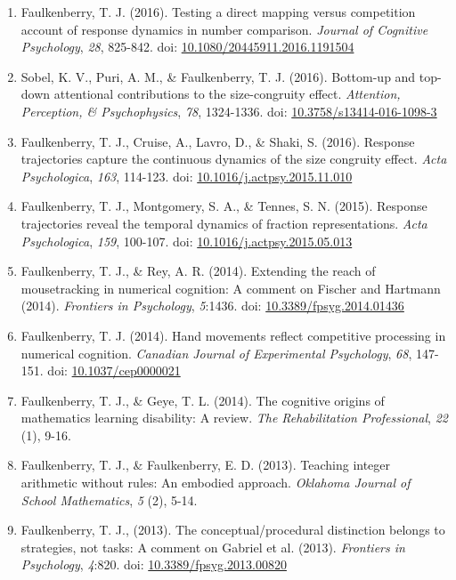 \documentclass[article,10pt]{article}
\begin{document}
\begin{enumerate}
\item Faulkenberry, T. J. (2016). Testing a direct mapping versus competition account of response dynamics in number comparison. \emph{Journal of Cognitive Psychology}, \emph{28}, 825-842. doi: \href{http://dx.doi.org/10.1080/20445911.2016.1191504}{10.1080/20445911.2016.1191504}
\item Sobel, K. V., Puri, A. M., \& Faulkenberry, T. J. (2016). Bottom-up and top-down attentional contributions to the size-congruity effect. \emph{Attention, Perception, \& Psychophysics}, \emph{78}, 1324-1336. doi: \href{http://dx.doi.org/10.3758/s13414-016-1098-3}{10.3758/s13414-016-1098-3}
\item Faulkenberry, T. J., Cruise, A., Lavro, D., \& Shaki, S. (2016). Response trajectories capture the continuous dynamics of the size congruity effect. \emph{Acta Psychologica}, \emph{163}, 114-123. doi: \href{http://dx.doi.org/10.1016/j.actpsy.2015.11.010}{10.1016/j.actpsy.2015.11.010}
\item Faulkenberry, T. J., Montgomery, S. A., \& Tennes, S. N. (2015). Response trajectories reveal the temporal dynamics of fraction representations. \emph{Acta Psychologica}, \emph{159}, 100-107. doi: \href{http://dx.doi.org/10.1016/j.actpsy.2015.05.013}{10.1016/j.actpsy.2015.05.013}
\item Faulkenberry, T. J., \& Rey, A. R. (2014). Extending the reach of mousetracking in numerical cognition: A comment on Fischer and Hartmann (2014). \emph{Frontiers in Psychology}, \emph{5}:1436. doi: \href{http://dx.doi.org/10.3389/fpsyg.2014.01436}{10.3389/fpsyg.2014.01436}
\item Faulkenberry, T. J. (2014). Hand movements reflect competitive processing in numerical cognition. \emph{Canadian Journal of Experimental Psychology}, \emph{68}, 147-151. doi: \href{http://dx.doi.org/10.1037/cep0000021}{10.1037/cep0000021}
\item Faulkenberry, T. J., \& Geye, T. L. (2014). The cognitive origins of mathematics learning disability: A review. \emph{The Rehabilitation Professional}, \emph{22} (1), 9-16.
\item Faulkenberry, T. J., \& Faulkenberry, E. D. (2013). Teaching integer arithmetic without rules: An embodied approach. \emph{Oklahoma Journal of School Mathematics}, \emph{5} (2), 5-14.
\item Faulkenberry, T. J., (2013). The conceptual/procedural distinction belongs to strategies, not tasks: A comment on Gabriel et al. (2013). \emph{Frontiers in Psychology}, \emph{4}:820. doi: \href{http://dx.doi.org/10.3389/fpsyg.2013.00820}{10.3389/fpsyg.2013.00820}

\end{enumerate}
\end{document}

